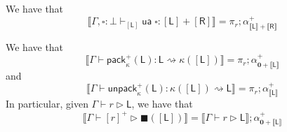 \documentclass[acmsmall,screen,review]{acmart}
\newcommand{\mb}[1]{\ensuremath{\mathbf{#1}}}
\newcommand{\ms}[1]{\ensuremath{\mathsf{#1}}}
\newcommand{\bhyp}[2]{#1 : #2}
\newcommand{\hasty}[4]{#1 \vdash_{#2} #3: {#4}}
\newcommand{\haslb}[3]{#1 \vdash #2 \rhd #3}
\newcommand{\lbsubst}[4]{#1 \vdash #2: #3 \rightsquigarrow #4}
\newcommand{\dnt}[1]{\llbracket{#1}\rrbracket}
\newcommand{\invar}{\square}
\newcommand{\outlb}{\blacksquare}
\begin{document}
\begin{lemma}
\begin{itemize}
  \end{itemize}
  \item We have that
  \begin{equation}
    \dnt{\hasty{\Gamma, \bhyp{\invar}{\bot}}{[\ms{L}]}{\ms{ua}\;\invar}{[\ms{L}] + [\ms{R}]}}
    = \pi_r ; \alpha^+_{\dnt{\ms{L}} + \dnt{\ms{R}}}
  \end{equation}
  \item We have that
  \begin{equation}
    \dnt{\lbsubst{\Gamma}{\ms{pack}_\kappa^+(\ms{L})}{\ms{L}}{\kappa([\ms{L}])}}   
      = \pi_r ; \alpha^+_{\mb{0} + \dnt{\ms{L}}}
  \end{equation}
  and
  \begin{equation}
    \dnt{\lbsubst{\Gamma}{\ms{unpack}_\kappa^+(\ms{L})}{\kappa([\ms{L}])}{\ms{L}}}
      = \pi_r ; \alpha^+_{\dnt{\ms{L}}}
  \end{equation}
  In particular, given $\haslb{\Gamma}{r}{\ms{L}}$, we have that
  \begin{equation}
    \dnt{\haslb{\Gamma}{[r]^+}{\outlb([\ms{L}])}}
    = \dnt{\haslb{\Gamma}{r}{\ms{L}}} ; \alpha^+_{\mb{0} + \dnt{\ms{L}}}
  \end{equation}
\end{lemma}

\bohmjacopini*

\label{proof:bohm-jacopini}
\end{document}

